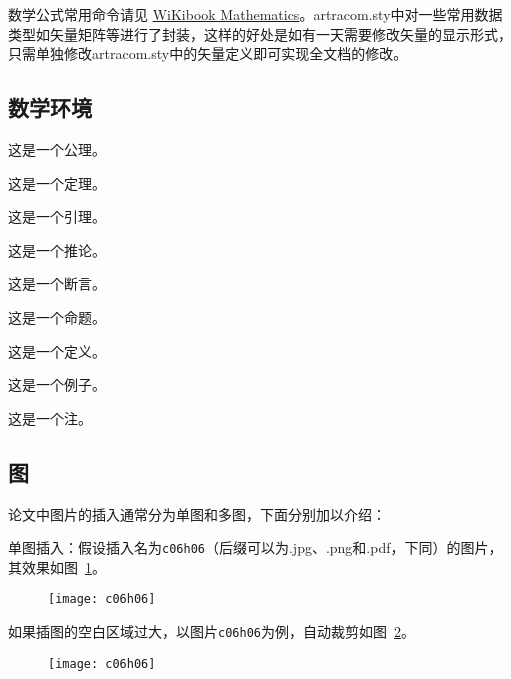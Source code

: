 数学公式常用命令请见 \href{https://en.wikibooks.org/wiki/LaTeX/Mathematics}{WiKibook Mathematics}。artracom.sty中对一些常用数据类型如矢量矩阵等进行了封装，这样的好处是如有一天需要修改矢量的显示形式，只需单独修改artracom.sty中的矢量定义即可实现全文档的修改。

\subsection{数学环境}

\begin{axiom}
   这是一个公理。 
\end{axiom}
\begin{theorem}
   这是一个定理。 
\end{theorem}
\begin{lemma}
   这是一个引理。 
\end{lemma}
\begin{corollary}
   这是一个推论。 
\end{corollary}
\begin{assertion}
   这是一个断言。 
\end{assertion}
\begin{proposition}
   这是一个命题。 
\end{proposition}
\begin{definition}
    这是一个定义。
\end{definition}
\begin{example}
    这是一个例子。
\end{example}
\begin{remark}
    这是一个注。
\end{remark}

\subsection{图}

论文中图片的插入通常分为单图和多图，下面分别加以介绍：

单图插入：假设插入名为\verb|c06h06|（后缀可以为.jpg、.png和.pdf，下同）的图片，其效果如图~\ref{fig:c06h06}。
\begin{figure}[htbp]
    \centering
    \texttt{[image: c06h06]}
    \label{fig:c06h06}
\end{figure}

如果插图的空白区域过大，以图片\verb|c06h06|为例，自动裁剪如图~\ref{fig:c06h06_trim}。
\begin{figure}[htbp]
    \centering
    \texttt{[image: c06h06]}
    \label{fig:c06h06_trim}
\end{figure}

